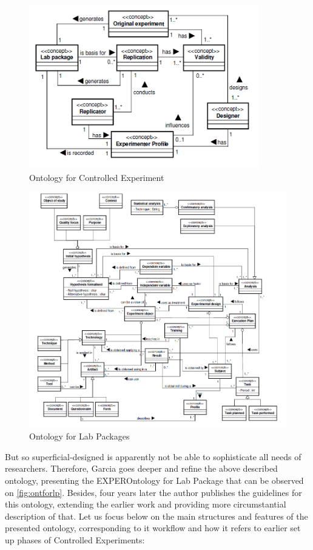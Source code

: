 	\begin{figure}
		\centering
		\includegraphics[width=10cm]{images/OntforCE.PNG}
		\caption{Ontology for Controlled Experiment\cite[p. 3]{Gar08}}
		\label{fig:ontforce}
	\end{figure}
	\begin{figure}
		\centering
		\includegraphics[width=18cm]{images/OntforLP.PNG}
		\caption{Ontology for Lab Packages\cite[p. 4]{Gar08}}
		\label{fig:ontforlp}
	\end{figure}
	But so superficial-designed is apparently not be able to sophisticate all needs of researchers. Therefore, Garcia goes deeper and refine the above described ontology,  presenting the EXPEROntology for Lab Package that can be observed on \autoref{fig:ontforlp}. Besides, four years later the author publishes the guidelines for this ontology\cite{Gar11}, extending the earlier work and providing more circumstantial description of that. Let us focus below on the main structures and features of the presented ontology, corresponding to it workflow and how it refers to earlier set up phases of Controlled Experiments:
